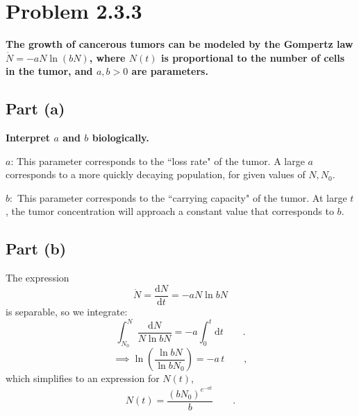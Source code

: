 \documentclass[draft]{agujournal2019}
\begin{document}
\newpage



\section{Problem 2.3.3}
\label{sec:p3}


\textbf{The growth of cancerous tumors can be modeled by the Gompertz law $\dot N = -a N \ln{(b N)}$, where $N(t)$ is proportional to the number of cells in the tumor, and $a,b>0$ are parameters.}

\subsection{Part (a)}
\label{subsec:p3a}
\textbf{Interpret $a$ and $b$ biologically.}
\par
$a$: This parameter corresponds to the ``loss rate" of the tumor. A large $a$ corresponds to a more quickly decaying population, for given values of $N,N_0$.

$b:$ This parameter corresponds to the ``carrying capacity" of the tumor. At large $t$, the tumor concentration will approach a constant value that corresponds to $b$. 


\subsection{Part (b)}
\label{subsec:p3b}
The expression 
\begin{equation*}
    \dot N = \frac{\mathrm{d}N}{\mathrm{d}t} = -a N \ln{bN}
\end{equation*}
is separable, so we integrate:
\begin{equation*}
    \int_{N_0}^N \frac{\mathrm{d}N}{N \ln{bN}} = -a\int_0^t \mathrm{d}t \qquad .
\end{equation*}
\begin{equation*}
    \implies\ln\left(\frac{\ln{bN}}{\ln{bN_0}}\right) = -a\,t \qquad ,
\end{equation*}
which simplifies to an expression for $N(t)$, 
\begin{equation}
\label{eqn:1}
    N(t) = \frac{(b N_0)^{e^{-at}}}{b} \qquad .
\end{equation}
\end{document}
